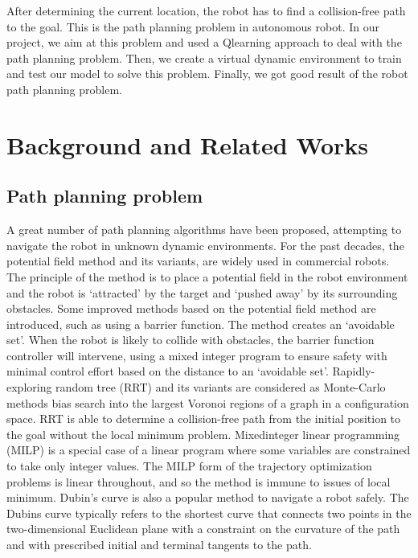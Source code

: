 \documentclass{acmtog} %
\begin{document}
After determining the current location, the robot has to find a collision-free path to the goal. This is the path planning problem
in autonomous robot. In our project, we aim at this problem and used a Qlearning approach to deal with the path planning problem.
Then, we create a virtual dynamic environment to train and test our model to solve this problem. Finally, we got good result of the robot path planning problem.
\section{Background and Related Works}
\subsection{Path planning problem}
A great number of path planning algorithms have been proposed, attempting to navigate the robot in unknown
dynamic environments. For the past decades, the potential field method and its variants, are
widely used in commercial robots. The principle of the method is to place a potential field in the robot
environment and the robot is ‘attracted’ by the target and ‘pushed away’ by its surrounding obstacles.
Some improved methods based on the potential field method are introduced, such as using a barrier function. The method creates an ‘avoidable set’. When the robot is likely to collide with obstacles, the barrier function controller will intervene, using a mixed integer
program to ensure safety with minimal control effort based on the distance to an ‘avoidable set’.
Rapidly-exploring random tree (RRT) and its variants are considered as Monte-Carlo methods bias search into the largest Voronoi regions of a graph in a configuration space. RRT is able to determine a collision-free path from the initial position to the goal without the local minimum problem. Mixedinteger
linear programming (MILP) is a special case of a linear program where some variables are
constrained to take only integer values. The MILP form of the trajectory optimization problems is
linear throughout, and so the method is immune to issues of local minimum.  Dubin's curve is also a
popular method to navigate a robot safely. The Dubins curve typically refers to the shortest curve that
connects two points in the two-dimensional Euclidean plane with a constraint on the curvature of the
path and with prescribed initial and terminal tangents to the path. 
\end{document}
